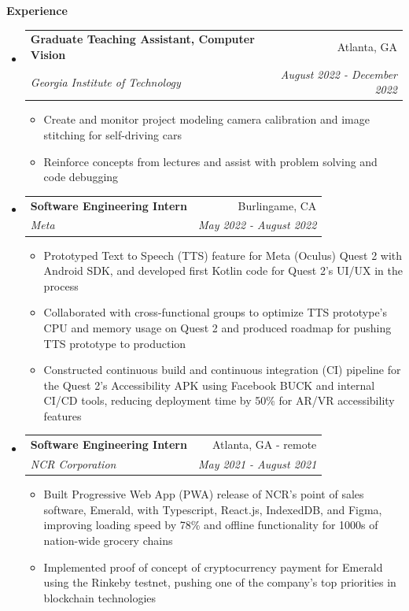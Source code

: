 \documentclass[letterpaper,10pt]{article}
\makeatletter
\newcommand{\resitem}[1]{\item #1 \vspace{-3.5pt}}  %
\newcommand{\resheading}[1]{{\large \colorbox{mygrey}{\begin{minipage}{0.989\textwidth}{\textbf{#1 \vphantom{p\^{E}}}}\end{minipage}}}}
\newcommand{\ressubheading}[4]{
\begin{tabular*}{7.0in}{l@{\extracolsep{\fill}}r}  
		\textbf{#1} & #2 \\
		\textit{#3} & \textit{#4} \\
\end{tabular*}\vspace{-6pt}}  %
\makeatother
\begin{document}

\resheading{Experience}

\begin{itemize}
\item
    \ressubheading{Graduate Teaching Assistant, Computer Vision}{Atlanta, GA}{Georgia Institute of Technology}{August 2022 - December 2022}
    \begin{itemize}
        \resitem{Create and monitor project modeling camera calibration and image stitching for self-driving cars}
        \resitem{Reinforce concepts from lectures and assist with problem solving and code debugging}
    \end{itemize}
\item
    \ressubheading{Software Engineering Intern}{Burlingame, CA}{Meta}{May 2022 - August 2022}
    \begin{itemize}
        \resitem{Prototyped Text to Speech (TTS) feature for Meta (Oculus) Quest 2 with Android SDK, and developed first Kotlin code for Quest 2's UI/UX in the process}
        \resitem{Collaborated with cross-functional groups to optimize TTS prototype's CPU and memory usage on Quest 2 and produced roadmap for pushing TTS prototype to production}
        \resitem{Constructed continuous build and continuous integration (CI) pipeline for the Quest 2's Accessibility APK using Facebook BUCK and internal CI/CD tools, reducing deployment time by 50\% for AR/VR accessibility features}
    \end{itemize}
\item
    \ressubheading{Software Engineering Intern}{Atlanta, GA - remote}{NCR Corporation}{May 2021 - August 2021}
    \begin{itemize}
        \resitem{Built Progressive Web App (PWA) release of NCR's point of sales software, Emerald, with Typescript, React.js, IndexedDB, and Figma, improving loading speed by 78\% and offline functionality for 1000s of nation-wide grocery chains}
        \resitem{Implemented proof of concept of cryptocurrency payment for Emerald using the Rinkeby testnet, pushing one of the company's top priorities in blockchain technologies}

\end{itemize}
\end{itemize}
\end{document}
